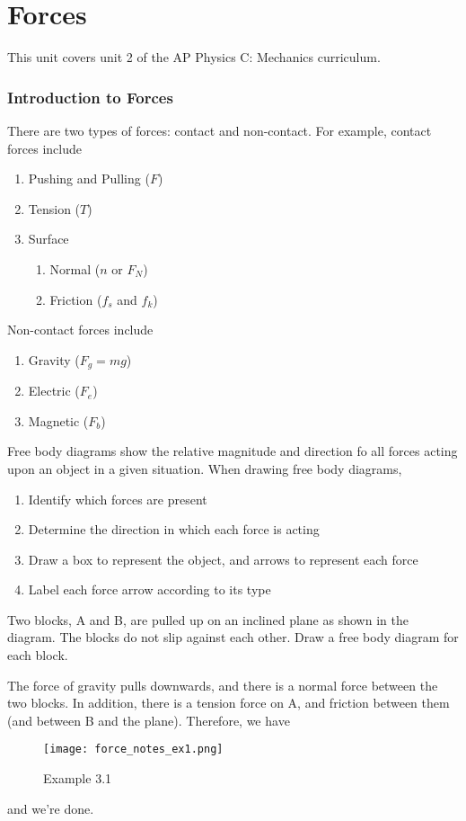 \documentclass[11pt]{article}
\begin{document}
\newpage

\part{Forces}
This unit covers unit 2 of the AP Physics C: Mechanics curriculum.
\section{Introduction to Forces}
There are two types of forces: contact and non-contact. For example, contact forces include
\begin{enumerate}
	\item Pushing and Pulling ($F$)
	\item Tension ($T$)
	\item Surface
		\begin{enumerate}
			\item Normal ($n$ or $F_N$)
			\item Friction ($f_s$ and $f_k$)
		\end{enumerate}
\end{enumerate}
Non-contact forces include
\begin{enumerate}
	\item Gravity ($F_g = mg$)
	\item Electric ($F_e$)
	\item Magnetic ($F_b$)
\end{enumerate}
Free body diagrams show the relative magnitude and direction fo all forces acting upon an object in a given situation. When drawing free body diagrams,
\begin{enumerate}
	\item Identify which forces are present
	\item Determine the direction in which each force is acting
	\item Draw a box to represent the object, and arrows to represent each force
	\item Label each force arrow according to its type
\end{enumerate}
\begin{example}
	Two blocks, A and B, are pulled up on an inclined plane as shown in the diagram. The blocks do not slip against each other. Draw a free body diagram for each block.
\end{example}

\begin{solution}
The force of gravity pulls downwards, and there is a normal force between the two blocks. In addition, there is a tension force on A, and friction between them (and between B and the plane). Therefore, we have
\begin{figure}[h!]
	\centering
	\texttt{[image: force\_notes\_ex1.png]}
	\caption{Example 3.1}
\end{figure}

\noindent and we're done.
\end{solution}
\end{document}
